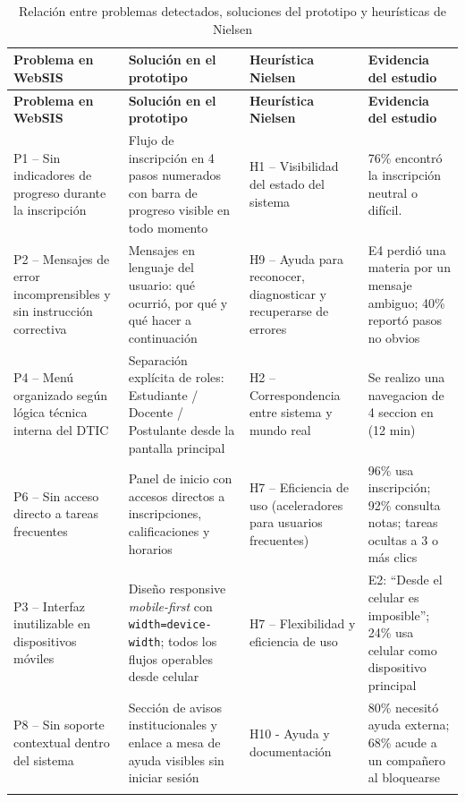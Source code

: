 {\scriptsize
\setlength{\tabcolsep}{3pt}
\renewcommand{\arraystretch}{1.25}
\begin{longtable}{|p{3cm}|p{4.2cm}|p{3.4cm}|p{4.7cm}|}
\hline
\textbf{Problema en WebSIS} & \textbf{Solución en el prototipo} & \textbf{Heurística Nielsen} & \textbf{Evidencia del estudio} \\
\hline
\endfirsthead

\hline
\textbf{Problema en WebSIS} & \textbf{Solución en el prototipo} & \textbf{Heurística Nielsen} & \textbf{Evidencia del estudio} \\
\hline
\endhead

P1 -- Sin indicadores de progreso durante la inscripción & Flujo de inscripción en 4 pasos numerados con barra de progreso visible en todo momento & H1 -- Visibilidad del estado del sistema & 76\% encontró la inscripción neutral o difícil. \\
\hline

P2 -- Mensajes de error incomprensibles y sin instrucción correctiva & Mensajes en lenguaje del usuario: qué ocurrió, por qué y qué hacer a continuación & H9 -- Ayuda para reconocer, diagnosticar y recuperarse de errores & E4 perdió una materia por un mensaje ambiguo; 40\% reportó pasos no obvios \\
\hline

P4 -- Menú organizado según lógica técnica interna del DTIC & Separación explícita de roles: Estudiante / Docente / Postulante desde la pantalla principal & H2 -- Correspondencia entre sistema y mundo real & Se realizo una navegacion de 4 seccion en (12 min) \\
\hline

P6 -- Sin acceso directo a tareas frecuentes & Panel de inicio con accesos directos a inscripciones, calificaciones y horarios & H7 -- Eficiencia de uso (aceleradores para usuarios frecuentes) & 96\% usa inscripción; 92\% consulta notas; tareas ocultas a 3 o más clics \\
\hline

P3 -- Interfaz inutilizable en dispositivos móviles & Diseño responsive \textit{mobile-first} con \texttt{width=device-width}; todos los flujos operables desde celular & H7 -- Flexibilidad y eficiencia de uso & E2: ``Desde el celular es imposible''; 24\% usa celular como dispositivo principal \\
\hline

P8 -- Sin soporte contextual dentro del sistema & Sección de avisos institucionales y enlace a mesa de ayuda visibles sin iniciar sesión & H10 - Ayuda y documentación & 80\% necesitó ayuda externa; 68\% acude a un compañero al bloquearse \\
\hline
\caption{Relación entre problemas detectados, soluciones del prototipo y heurísticas de Nielsen}\label{tab:heuristicas-nielsen-prototipo}
\end{longtable}
}
